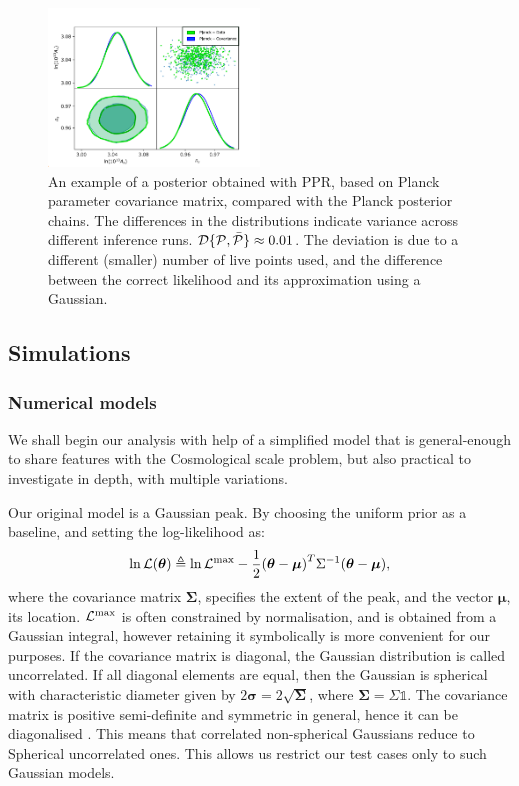 \documentclass[usenatbib]{mnras}
\begin{document}
\begin{figure}
  \includegraphics[width=0.5\textwidth]{./illustrations/triangle-fit.pdf}
  \caption{An example of a posterior obtained with PPR, based on
    Planck parameter covariance matrix, compared with the Planck
    posterior chains. The differences in the distributions indicate
    variance across different inference runs.
    ${\cal D}\{ {\cal P}, \bar{\cal P}\} \approx 0.01$. The deviation
    is due to a different (smaller) number of live points used, and
    the difference between the correct likelihood and its
    approximation using a Gaussian. \label{fig:overlay-posteriors}}
\end{figure}


\subsection{Simulations}
\subsubsection{Numerical models}

We shall begin our analysis with help of a simplified model that is
general-enough to share features with the Cosmological scale problem,
but also practical to investigate in depth, with multiple variations.

Our original model is a Gaussian peak. By choosing the uniform prior
as a baseline, and setting the log-likelihood as:
\begin{equation}
  \ln {\cal L}(\bm{\theta}) \triangleq \ln {\cal L}^\text{max}- \dfrac{1}{2}{(\bm{\theta} - \bm{\mu})}^{T}\Sigma^{-1}(\bm{\theta}-\bm{\mu}),
\end{equation}
where the covariance matrix \(\bm{\Sigma}\), specifies the extent of
the peak, and the vector \(\bm{\mu}\), its location.
\({\cal L}^\text{max}\) is often constrained by normalisation, and is
obtained from a Gaussian integral, however retaining it symbolically
is more convenient for our purposes.  If the covariance matrix is
diagonal, the Gaussian distribution is called uncorrelated. If all
diagonal elements are equal, then the Gaussian is spherical with
characteristic diameter given by
\(2\bm{\sigma} = 2\sqrt{\bm{\Sigma}}\), where
\(\bm{\Sigma} = \Sigma \mathds{1}\).  The covariance matrix is
positive semi-definite and symmetric in general, hence it can be
diagonalised \citep{taboga2017lectures}. This means that correlated
non-spherical Gaussians reduce to Spherical uncorrelated ones. This
allows us restrict our test cases only to such Gaussian models.
\end{document}
